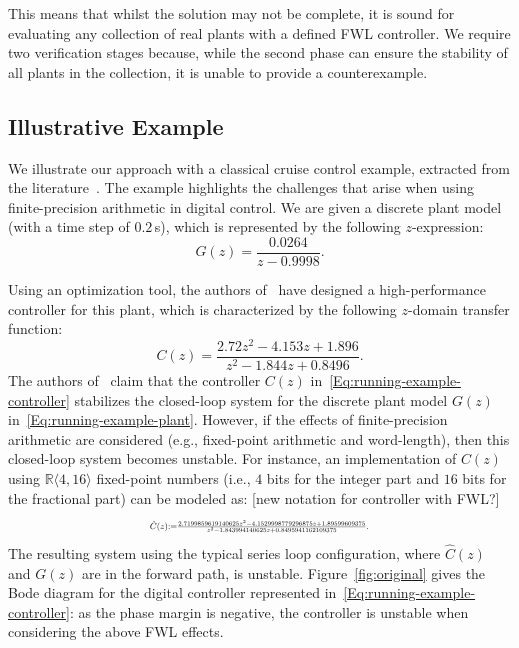 \documentclass[final]{sig-alternate-05-2015}
\newcommand{\aabatecmt}[1]{{\color{blue}#1}}
\begin{document}
This means that whilst the solution may not be complete, it is sound for
evaluating any collection of real plants with a defined FWL controller. 
We require two verification stages because,
while the second phase can ensure the stability of all plants in the collection, 
it is unable to provide a counterexample.

\subsection{Illustrative Example} \label{sec:running-ex}

We illustrate our approach with a classical cruise control example,
extracted from the literature~\cite{Astrom08}.  The example highlights the
challenges that arise when using finite-precision arithmetic in digital
control.  We are given a discrete plant model (with a time step of
$0.2$\,s), which is represented by the following $z$-expression:
%
\begin{equation}
\label{Eq:running-example-plant}
G(z) = \frac{0.0264}{z-0.9998}.
\end{equation}

Using an optimization tool, the authors
of~\cite{DBLP:conf/hybrid/WangGRJF16} have designed a high-performance
controller for this plant, which is characterized by the following
$z$-domain transfer function:
%
\begin{equation}
\label{Eq:running-example-controller}
C(z) = \frac{2.72z^2 - 4.153z + 1.896}{z^2 - 1.844z + 0.8496}.
\end{equation}
%
The authors of~\cite{DBLP:conf/hybrid/WangGRJF16} claim that the controller
$C(z)$ in~\eqref{Eq:running-example-controller} stabilizes the
closed-loop system for the discrete plant model $G(z)$ in~\eqref{Eq:running-example-plant}.  
However, if the effects of finite-precision arithmetic are considered (e.g., fixed-point arithmetic and
word-length), then this closed-loop system becomes unstable.
%
For instance, an implementation of $C(z)$ using 
$\mathbb R \langle 4, 16 \rangle$ fixed-point
numbers (i.e., $4$ bits for the integer part and $16$ bits for the
fractional part) can be modeled as:
%
\aabatecmt{[new notation for controller with FWL?]}
\begin{equation}
\label{Eq:running-example-controller-quantized}
\resizebox{.47\textwidth}{!}{
$\hat{C}(z) {:=} \frac{2.7199859619140625z^2{-}4.1529998779296875z
{+}1.89599609375}{z^2{-}1.843994140625z+0.8495941162109375}$. 
}
\end{equation} 
%
The resulting system using the typical series loop configuration, where
$\hat{C}(z)$ and $G(z)$ are in the forward path, is unstable. 
Figure~\ref{fig:original} gives the Bode diagram for the digital controller
represented in~\eqref{Eq:running-example-controller}: 
as the phase margin is negative, 
the controller is unstable when considering the above FWL effects.
\end{document}
